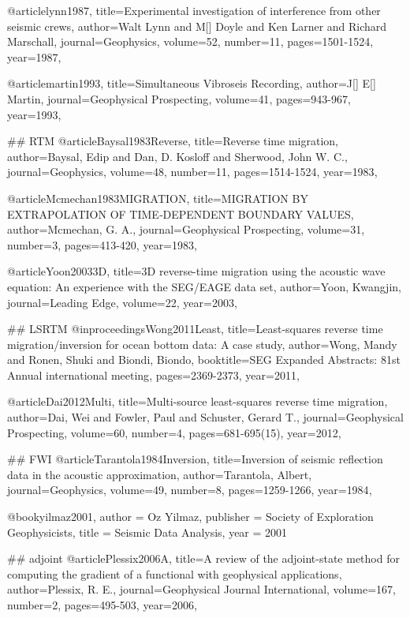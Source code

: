 {@article{lynn1987,
  title={Experimental investigation of interference from other seismic crews},
  author={Walt Lynn and M[] Doyle and Ken Larner and Richard Marschall},
  journal={Geophysics},
  volume={52},
  number={11},
  pages={1501-1524},
  year={1987},
}


@article{martin1993,
  title={Simultaneous Vibroseis Recording},
  author={J[] E[] Martin},
  journal={Geophysical Prospecting},
  volume={41},
  pages={943-967},
  year={1993},
}


## RTM
@article{Baysal1983Reverse,
  title={Reverse time migration},
  author={Baysal, Edip and Dan, D. Kosloff and Sherwood, John W. C.},
  journal={Geophysics},
  volume={48},
  number={11},
  pages={1514-1524},
  year={1983},
}

@article{Mcmechan1983MIGRATION,
  title={MIGRATION BY EXTRAPOLATION OF TIME‐DEPENDENT BOUNDARY VALUES},
  author={Mcmechan, G. A.},
  journal={Geophysical Prospecting},
  volume={31},
  number={3},
  pages={413-420},
  year={1983},
}

@article{Yoon20033D,
  title={3{D} reverse-time migration using the acoustic wave equation: An experience with the SEG/EAGE data set},
  author={Yoon, Kwangjin},
  journal={Leading Edge},
  volume={22},
  year={2003},
}

## LSRTM
@inproceedings{Wong2011Least,
  title={Least‐squares reverse time migration/inversion for ocean bottom data: A case study},
  author={Wong, Mandy and Ronen, Shuki and Biondi, Biondo},
  booktitle={SEG Expanded Abstracts: 81st Annual international meeting},
  pages={2369-2373},
  year={2011},
}

@article{Dai2012Multi,
  title={Multi-source least-squares reverse time migration},
  author={Dai, Wei and Fowler, Paul and Schuster, Gerard T.},
  journal={Geophysical Prospecting},
  volume={60},
  number={4},
  pages={681-695(15)},
  year={2012},
}

## FWI
@article{Tarantola1984Inversion,
  title={Inversion of seismic reflection data in the acoustic approximation},
  author={Tarantola, Albert},
  journal={Geophysics},
  volume={49},
  number={8},
  pages={1259-1266},
  year={1984},
}

@book{yilmaz2001,
   author = {Oz Yilmaz},
   publisher = {Society of Exploration Geophysicists},
   title = {Seismic Data Analysis},
   year = {2001}
}

## adjoint
@article{Plessix2006A,
  title={A review of the adjoint-state method for computing the gradient of a functional with geophysical applications},
  author={Plessix, R. E.},
  journal={Geophysical Journal International},
  volume={167},
  number={2},
  pages={495-503},
  year={2006},
}

}
